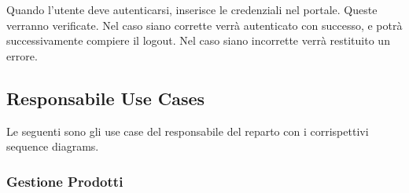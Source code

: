 \documentclass[12pt, a4paper]{report}
\begin{document}
Quando l'utente deve autenticarsi, inserisce le credenziali nel portale. Queste
verranno verificate. Nel caso siano corrette verrà autenticato con successo, e
potrà successivamente compiere il logout. Nel caso siano incorrette verrà
restituito un errore.

\newpage

\subsection{Responsabile Use Cases}

Le seguenti sono gli use case del responsabile del reparto con i corrispettivi 
sequence diagrams.

\subsubsection{Gestione Prodotti}
\end{document}

